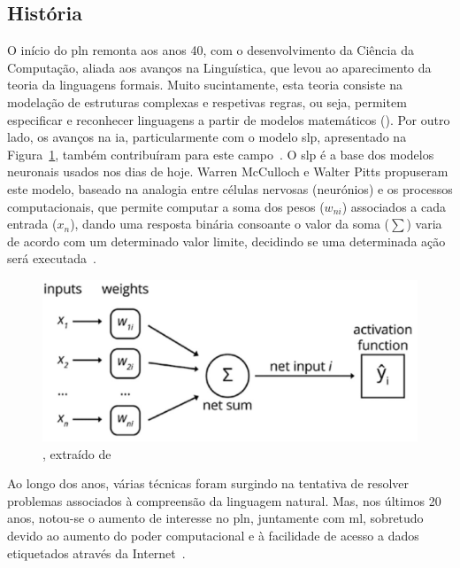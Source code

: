 \subsection{História}
O início do \gls{pln} remonta aos anos 40, com o desenvolvimento da Ciência da Computação, aliada aos avanços na Linguística, que levou ao aparecimento da teoria da linguagens formais. Muito sucintamente, esta teoria consiste na modelação de estruturas complexas e respetivas regras, ou seja, permitem especificar e reconhecer linguagens a partir de modelos matemáticos (). Por outro lado, os avanços na \gls{ia}, particularmente com o modelo \gls{slp}, apresentado na Figura~\ref{fig:slp}, também contribuíram para este campo~\parencite{applied_natural_language_processing_with_python}. O \gls{slp} é a base dos modelos neuronais usados nos dias de hoje. Warren McCulloch e Walter Pitts propuseram este modelo, baseado na analogia entre células nervosas (neurónios) e os processos computacionais, que permite computar a soma dos pesos ($w_{ni}$) associados a cada entrada ($x_{n}$), dando uma resposta binária consoante o valor da soma ($\sum$) varia de acordo com um determinado valor limite, decidindo se uma determinada ação será executada~\parencite{introduction_theory_neural_computation}.
%
\begin{figure}
    \centering
    \includegraphics[width=.7\textwidth]{ch03/assets/slp_model.jpg}
    \caption{, extraído de~\textcite{applied_natural_language_processing_with_python}}
    \label{fig:slp}
\end{figure}

Ao longo dos anos, várias técnicas foram surgindo na tentativa de resolver problemas associados à compreensão da linguagem natural. Mas, nos últimos 20 anos, notou-se o aumento de interesse no \gls{pln}, juntamente com \gls{ml}, sobretudo devido ao aumento do poder computacional e à facilidade de acesso a dados etiquetados através da Internet~\parencite{applied_natural_language_processing_with_python}.

